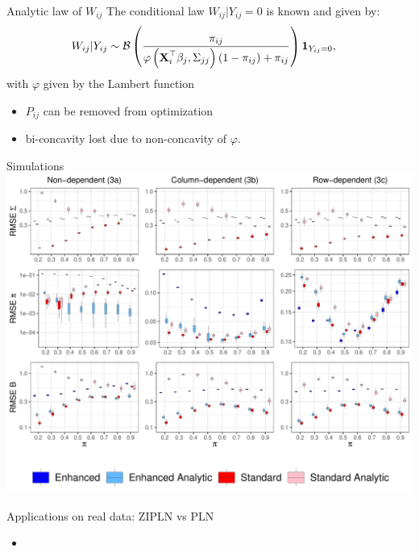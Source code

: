 \documentclass{beamer}
\theoremstyle{remark}
\begin{document}
\begin{frame}{Analytic law of $W_{ij}$}
    The conditional law $W_{ij} | Y_{ij} = 0$ is known and given by:
    \begin{align*}\displaystyle
           W_{ij} | Y_{ij}  &\sim \mathcal B\left(\frac{\pi_{ij}}{ \varphi\left(\boldsymbol{\mathbf{X}}_i^{\top} \beta_j, \Sigma_{jj}\right)
       \left(1 - \pi_{ij}\right) + \pi_{ij}}\right) \mathbf 1_{Y_{ij} = 0},\end{align*}
with $\varphi$ given by the Lambert function

\begin{itemize}
    \item $P_{ij}$ can be removed from optimization
    \item bi-concavity lost due to non-concavity of $\varphi$.
\end{itemize}
\end{frame}
\begin{frame}{Simulations}
    \includegraphics[scale=0.30]{figures/proba_stat.pdf}
\end{frame}
\begin{frame}
\end{frame}
\begin{frame}{Applications on real data: ZIPLN vs PLN}
    \begin{itemize}
        \item
    \end{itemize}

\end{frame}
\end{document}

